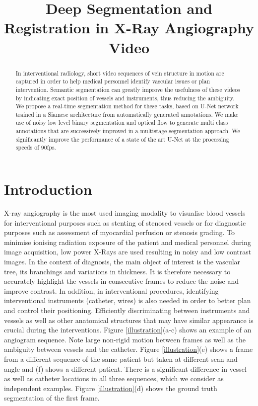 \documentclass{bmvc2k}
\title{Deep Segmentation and Registration in X-Ray Angiography Video}
\begin{document}
	\maketitle
	
	\begin{abstract}
		In interventional radiology, short video sequences of vein structure in motion are captured in order to help medical personnel identify vascular issues or plan intervention. Semantic segmentation can greatly improve the usefulness of these videos by indicating exact position of vessels and instruments, thus reducing the ambiguity.  We propose a real-time segmentation method for these tasks, based on  U-Net network trained in a Siamese architecture from automatically generated annotations. We make use of noisy low level binary segmentation  and optical flow to generate multi class annotations that are successively improved in a multistage segmentation approach. We significantly improve the performance of a state of the art U-Net at the processing speeds of 90fps.
	\end{abstract}
	\section{Introduction}
	X-ray angiography is the most used imaging modality to visualise blood vessels for interventional purposes such as stenting of stenosed vessels or for diagnostic purposes such as assessment of myocardial perfusion or stenosis grading.
	To minimise ionising radiation exposure of the patient and medical personnel during image acquisition, low power X-Rays are used resulting in noisy and low contrast images. In the context of diagnosis, the main object of interest is the vascular tree, its branchings and variations in thickness. It is therefore necessary to accurately highlight the vessels in consecutive frames to reduce the noise and improve contrast. In addition, in interventional procedures, identifying interventional instruments (catheter, wires) is also needed in order to better plan and control their positioning.  Efficiently discriminating between instruments and vessels as well as other anatomical structures that may have similar appearance is crucial during the interventions. Figure \ref{illustration}(a-c) shows an example of an angiogram sequence. Note large non-rigid motion between frames as well as the ambiguity between vessels and the catheter.  Figure \ref{illustration}(e) shows a frame from a different sequence of the same patient but taken at different scan and angle and (f) shows a different patient.  There is a significant difference in vessel as well as catheter locations in all three sequences, which we consider as independent examples.  Figure \ref{illustration}(d) shows the ground truth segmentation of the first frame.  
	
\end{document}
